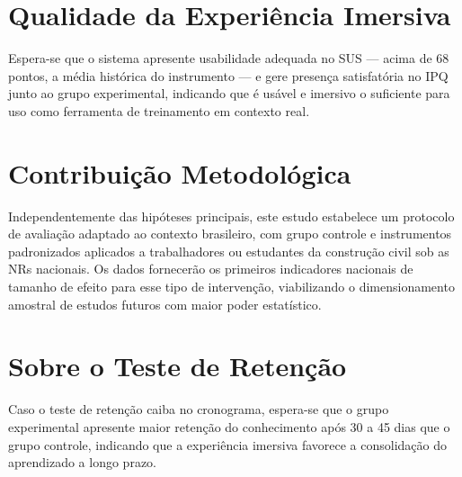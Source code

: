 \section{Qualidade da Experiência Imersiva}

Espera-se que o sistema apresente usabilidade adequada no SUS --- acima de 68 pontos, a média histórica do instrumento --- e gere presença satisfatória no IPQ junto ao grupo experimental, indicando que é usável e imersivo o suficiente para uso como ferramenta de treinamento em contexto real.

\section{Contribuição Metodológica}

Independentemente das hipóteses principais, este estudo estabelece um protocolo de avaliação adaptado ao contexto brasileiro, com grupo controle e instrumentos padronizados aplicados a trabalhadores ou estudantes da construção civil sob as NRs nacionais. Os dados fornecerão os primeiros indicadores nacionais de tamanho de efeito para esse tipo de intervenção, viabilizando o dimensionamento amostral de estudos futuros com maior poder estatístico.

\section{Sobre o Teste de Retenção}

Caso o teste de retenção caiba no cronograma, espera-se que o grupo experimental apresente maior retenção do conhecimento após 30 a 45 dias que o grupo controle, indicando que a experiência imersiva favorece a consolidação do aprendizado a longo prazo.
